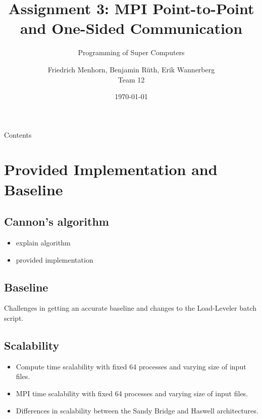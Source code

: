 \documentclass[9pt,pdftex]{beamer}
\title{Assignment 3: MPI Point-to-Point and One-Sided Communication}
\subtitle{Programming of Super Computers}
\author[Friedrich Menhorn, Benjamin Rüth, Erik Wannerberg] {Friedrich Menhorn, Benjamin Rüth, Erik Wannerberg \\ Team 12} %
\date{\today}
\institute{Technische Universität München}
\begin{document}
\frame{\maketitle}

\begin{frame}{Contents}
\tableofcontents
\end{frame}

\section{Provided Implementation and Baseline}
\begin{frame}{\phantom{Contents}}
\tableofcontents[
  currentsection  
]
\end{frame}

\subsection{Cannon’s algorithm}
\begin{frame}{\insertsubsection}
\begin{itemize}
\item explain algorithm
\item provided implementation
\end{itemize}
\end{frame}


\subsection{Baseline}
\begin{frame}{\insertsubsection}
Challenges in getting an accurate baseline and changes to the Load-Leveler batch script.
\end{frame}

\subsection{Scalability}
\begin{frame}{\insertsubsection}
\begin{itemize}
\item Compute time scalability with fixed 64 processes and varying size of input files.
\item MPI time scalability with fixed 64 processes and varying size of input files.
\item Differences in scalability between the Sandy Bridge and Haswell architectures.
\end{itemize}
\end{frame}
\end{document}
